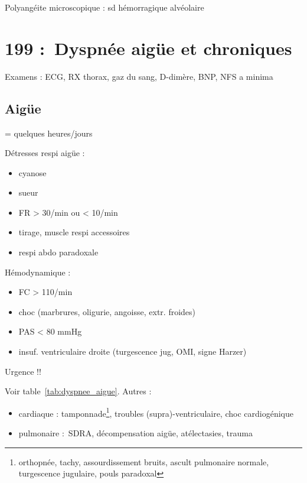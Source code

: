 Polyangéite microscopique : sd hémorragique alvéolaire

\section{199 : Dyspnée aigüe et chroniques}
\label{sec:199_dyspnee_aigue_et_chronique}
Examens : ECG, RX thorax, gaz du sang, D-dimère, BNP, NFS a minima

\subsection{Aigüe}
= quelques heures/jours

Détresses respi aigüe :
\begin{itemize}
\item cyanose
\item sueur
\item FR > 30/min ou < 10/min
\item tirage, muscle respi accessoires
\item respi abdo paradoxale
\end{itemize}
Hémodynamique :
\begin{itemize}
\item FC > 110/min
\item choc (marbrures, oligurie, angoisse, extr. froides)
\item PAS < 80 mmHg
\item insuf. ventriculaire droite (turgescence jug, OMI, signe Harzer)
\end{itemize}
Urgence !!

Voir table~\ref{tab:dyspnee_aigue}. Autres :
\begin{itemize}
\item cardiaque : tamponnade\footnote{orthopnée, tachy, assourdissement bruits,
  ascult pulmonaire normale, turgescence jugulaire, pouls paradoxal}, troubles
(supra)-ventriculaire, choc cardiogénique
\item pulmonaire : SDRA, décompensation aigüe, atélectasies, trauma
\end{itemize}


